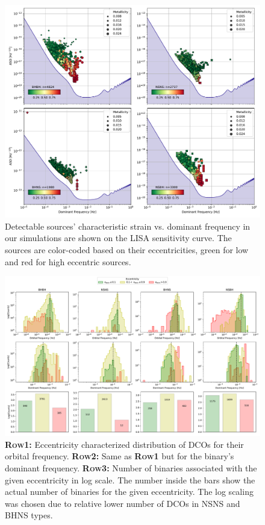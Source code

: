 \documentclass[journal, twocolumns]{IEEEtran}
\begin{document}
	 \begin{figure}[!h]%
		\centering
		\includegraphics[width=\columnwidth]{analysis_data/main_analysis_folder/dco_typewise_snr}
		\caption{Detectable sources' characteristic strain vs. dominant frequency in our simulations are shown on the LISA sensitivity curve. The sources are color-coded based on their eccentricities, green for low and red for high eccentric sources.}
		\label{fig:alldcosnrplotting}
	\end{figure}

    \begin{figure}[!h]
		\centering
		\includegraphics[width=\columnwidth]{analysis_data/dco_fdom_ecc_details}
		\caption{\textsc{\textbf{Row1:}} Eccentricity characterized distribution of DCOs for their orbital frequency. \textsc{\textbf{Row2:}} Same as \textsc{\textbf{Row1}} but for the binary's dominant frequency. \textsc{\textbf{Row3:}} Number of binaries associated with the given eccentricity in log scale. The number inside the bars show the actual number of binaries for the given eccentricity. The log scaling was chosen due to relative lower number of DCOs in NSNS and BHNS types.}
		\label{fig:dcofdomeccdetails}
	\end{figure}
\end{document}
